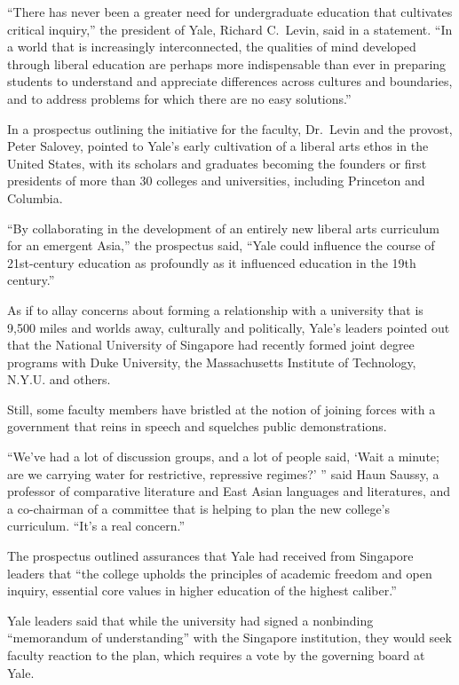 ﻿\documentclass[12pt]{article}
\begin{document}
``There has never been a greater need for undergraduate education that cultivates critical
inquiry,'' the president of Yale, Richard C.~Levin, said in a statement. ``In a world that is
increasingly interconnected, the qualities of mind developed through liberal education are perhaps
more indispensable than ever in preparing students to understand and appreciate differences across
cultures and boundaries, and to address problems for which there are no easy solutions.''

In a prospectus outlining the initiative for the faculty, Dr.~Levin and the provost, Peter Salovey,
pointed to Yale's early cultivation of a liberal arts ethos in the United States, with its scholars
and graduates becoming the founders or first presidents of more than 30 colleges and universities,
including Princeton and Columbia.

``By collaborating in the development of an entirely new liberal arts curriculum for an emergent
Asia,'' the prospectus said, ``Yale could influence the course of 21st-century education as
profoundly as it influenced education in the 19th century.''

As if to allay concerns about forming a relationship with a university that is 9,500 miles and
worlds away, culturally and politically, Yale's leaders pointed out that the National University of
Singapore had recently formed joint degree programs with Duke University, the Massachusetts
Institute of Technology, N.Y.U. and others.

Still, some faculty members have bristled at the notion of joining forces with a government that
reins in speech and squelches public demonstrations.

``We've had a lot of discussion groups, and a lot of people said, `Wait a minute; are we carrying
water for restrictive, repressive regimes?' '' said Haun Saussy, a professor of comparative
literature and East Asian languages and literatures, and a co-chairman of a committee that is
helping to plan the new college's curriculum. ``It's a real concern.''

The prospectus outlined assurances that Yale had received from Singapore leaders that ``the college
upholds the principles of academic freedom and open inquiry, essential core values in higher
education of the highest caliber.''

Yale leaders said that while the university had signed a nonbinding ``memorandum of understanding''
with the Singapore institution, they would seek faculty reaction to the plan, which requires a vote
by the governing board at Yale.
\end{document}
